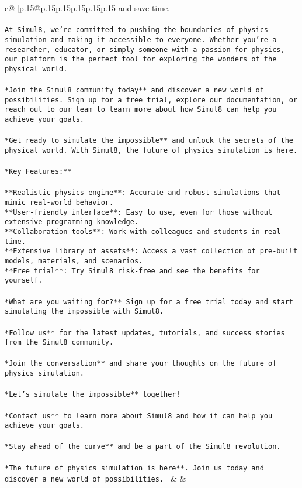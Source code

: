 \documentclass{article}
\begin{document}
{\begin{supertabular}{c@{$\;$}|p{.15\linewidth}@{}p{.15\linewidth}p{.15\linewidth}p{.15\linewidth}p{.15\linewidth}p{.15\linewidth}}
{{{and save time.\\ \tt \\ \tt At Simul8, we're committed to pushing the boundaries of physics simulation and making it accessible to everyone. Whether you're a researcher, educator, or simply someone with a passion for physics, our platform is the perfect tool for exploring the wonders of the physical world.\\ \tt \\ \tt **Join the Simul8 community today** and discover a new world of possibilities. Sign up for a free trial, explore our documentation, or reach out to our team to learn more about how Simul8 can help you achieve your goals.\\ \tt \\ \tt **Get ready to simulate the impossible** and unlock the secrets of the physical world. With Simul8, the future of physics simulation is here.\\ \tt \\ \tt **Key Features:**\\ \tt \\ \tt *   **Realistic physics engine**: Accurate and robust simulations that mimic real-world behavior.\\ \tt *   **User-friendly interface**: Easy to use, even for those without extensive programming knowledge.\\ \tt *   **Collaboration tools**: Work with colleagues and students in real-time.\\ \tt *   **Extensive library of assets**: Access a vast collection of pre-built models, materials, and scenarios.\\ \tt *   **Free trial**: Try Simul8 risk-free and see the benefits for yourself.\\ \tt \\ \tt **What are you waiting for?** Sign up for a free trial today and start simulating the impossible with Simul8.\\ \tt \\ \tt **Follow us** for the latest updates, tutorials, and success stories from the Simul8 community.\\ \tt \\ \tt **Join the conversation** and share your thoughts on the future of physics simulation.\\ \tt \\ \tt **Let's simulate the impossible** together!\\ \tt \\ \tt **Contact us** to learn more about Simul8 and how it can help you achieve your goals.\\ \tt \\ \tt **Stay ahead of the curve** and be a part of the Simul8 revolution.\\ \tt \\ \tt **The future of physics simulation is here**. Join us today and discover a new world of possibilities. 
	  } 
	   } 
	   } 
	 & & \\ 
 


\end{supertabular}}
\end{document}

